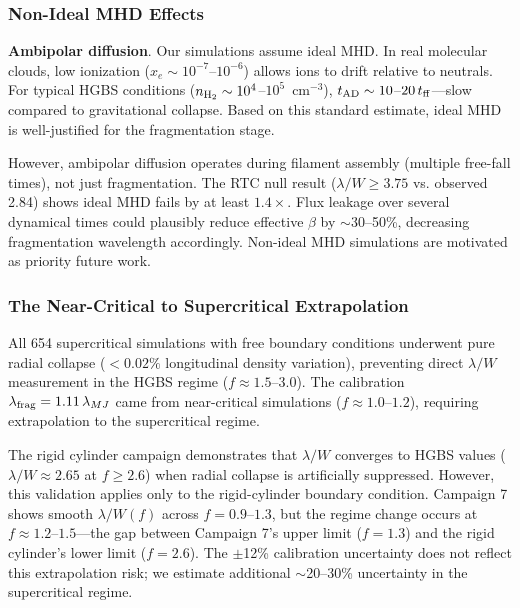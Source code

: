 \documentclass[twocolumn,usenatbib]{mnras}
\begin{document}
\subsubsection{Non-Ideal MHD Effects}

\textbf{Ambipolar diffusion}. Our simulations assume ideal MHD. In real molecular clouds, low ionization ($x_e \sim 10^{-7}$--$10^{-6}$) allows ions to drift relative to neutrals. For typical HGBS conditions ($n_{\rm H_2} \sim 10^4$--$10^5$~cm$^{-3}$), $t_{\rm AD} \sim 10$--$20\,t_{\rm ff}$---slow compared to gravitational collapse. Based on this standard estimate, ideal MHD is well-justified for the fragmentation stage.

However, ambipolar diffusion operates during filament assembly (multiple free-fall times), not just fragmentation. The RTC null result ($\lambda/W \geq 3.75$ vs. observed 2.84) shows ideal MHD fails by at least $1.4\times$. Flux leakage over several dynamical times could plausibly reduce effective $\beta$ by $\sim$30--50\%, decreasing fragmentation wavelength accordingly. Non-ideal MHD simulations are motivated as priority future work.

\subsubsection{The Near-Critical to Supercritical Extrapolation}
\label{sec:extrapolation_problem}

All 654 supercritical simulations with free boundary conditions underwent pure radial collapse ($<0.02\%$ longitudinal density variation), preventing direct $\lambda/W$ measurement in the HGBS regime ($f \approx 1.5$--$3.0$). The calibration $\lambda_{\rm frag} = 1.11\,\lambda_{MJ}$ came from near-critical simulations ($f \approx 1.0$--$1.2$), requiring extrapolation to the supercritical regime.

The rigid cylinder campaign demonstrates that $\lambda/W$ converges to HGBS values ($\lambda/W \approx 2.65$ at $f \geq 2.6$) when radial collapse is artificially suppressed. However, this validation applies only to the rigid-cylinder boundary condition. Campaign 7 shows smooth $\lambda/W(f)$ across $f = 0.9$--$1.3$, but the regime change occurs at $f \approx 1.2$--$1.5$---the gap between Campaign 7's upper limit ($f = 1.3$) and the rigid cylinder's lower limit ($f = 2.6$). The $\pm$12\% calibration uncertainty does not reflect this extrapolation risk; we estimate additional $\sim$20--30\% uncertainty in the supercritical regime.
\end{document}
